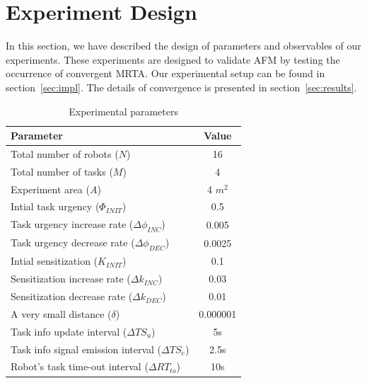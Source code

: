 \documentclass[letterpaper, 10 pt, conference]{ieeeconf}  %
\begin{document}
\section{Experiment Design}
\label{sec:expt-design}
In this section, we have described the design of parameters and observables of our experiments.
These experiments are designed to validate AFM by testing the occurrence of convergent MRTA. Our experimental setup can be found in section~\ref{sec:impl}. The details of convergence is presented in section~\ref{sec:results}.
%
\begin{table}
\caption{Experimental parameters}
\label{table:params}
\begin{center}
\begin{tabular}{|l||c|}
\hline Parameter & Value\\
\hline Total number of robots ($N$) & 16\\
\hline Total number of tasks ($M$) & 4\\
\hline Experiment area ($A$) & 4 $m^2$\\
\hline Intial task urgency ($\Phi_{INIT}$) & 0.5\\
\hline Task urgency increase rate ($\Delta\phi_{INC}$) & 0.005\\
\hline Task urgency decrease rate ($\Delta\phi_{DEC}$) & 0.0025\\
\hline Intial sensitization ($K_{INIT}$) & 0.1\\
\hline Sensitization increase rate ($\Delta k_{INC}$) & 0.03\\
\hline Sensitization decrease rate ($\Delta k_{DEC}$) & 0.01\\
\hline A very small distance ($\delta$)& 0.000001\\
\hline Task info update interval ($\Delta TS_{u}$) & 5s\\
\hline Task info signal emission interval ($ \Delta TS_{e}$)& 2.5s\\
\hline Robot's task time-out interval ($\Delta RT_{to} $)& 10s\\
\hline
\end{tabular}
\end{center}
\end{table}
\end{document}
